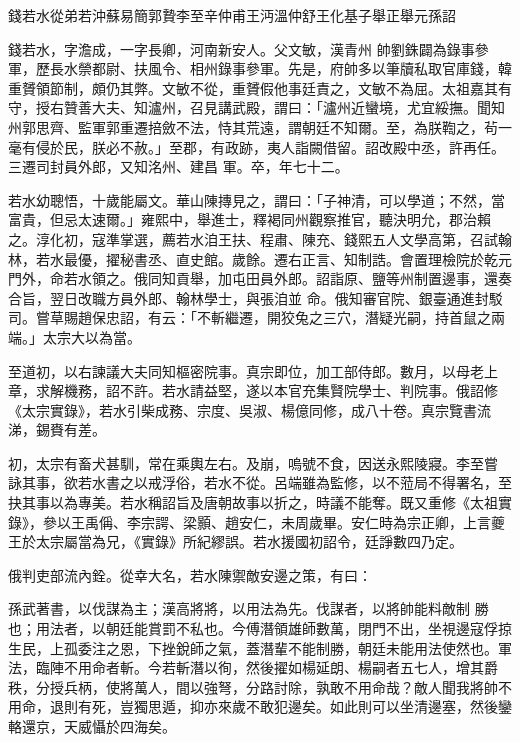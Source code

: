 
\begin{pinyinscope}

 錢若水從弟若沖蘇易簡郭贄李至辛仲甫王沔溫仲舒王化基子舉正舉元孫詔



 錢若水，字澹成，一字長卿，河南新安人。父文敏，漢青州
 帥劉銖闢為錄事參軍，歷長水禜都尉、扶風令、相州錄事參軍。先是，府帥多以筆牘私取官庫錢，韓重贇領節制，頗仍其弊。文敏不從，重贇假他事廷責之，文敏不為屈。太祖嘉其有守，授右贊善大夫、知瀘州，召見講武殿，謂曰：「瀘州近蠻境，尤宜綏撫。聞知州郭思齊、監軍郭重遷掊斂不法，恃其荒遠，謂朝廷不知爾。至，為朕鞫之，茍一毫有侵於民，朕必不赦。」至郡，有政跡，夷人詣闕借留。詔改殿中丞，許再任。三遷司封員外郎，又知洺州、建昌
 軍。卒，年七十二。



 若水幼聰悟，十歲能屬文。華山陳摶見之，謂曰：「子神清，可以學道；不然，當富貴，但忌太速爾。」雍熙中，舉進士，釋褐同州觀察推官，聽決明允，郡治賴之。淳化初，寇準掌選，薦若水洎王扶、程肅、陳充、錢熙五人文學高第，召試翰林，若水最優，擢秘書丞、直史館。歲餘。遷右正言、知制誥。會置理檢院於乾元門外，命若水領之。俄同知貢舉，加屯田員外郎。詔詣原、鹽等州制置邊事，還奏合旨，翌日改職方員外郎、翰林學士，與張洎並
 命。俄知審官院、銀臺通進封駁司。嘗草賜趙保忠詔，有云：「不斬繼遷，開狡兔之三穴，潛疑光嗣，持首鼠之兩端。」太宗大以為當。



 至道初，以右諫議大夫同知樞密院事。真宗即位，加工部侍郎。數月，以母老上章，求解機務，詔不許。若水請益堅，遂以本官充集賢院學士、判院事。俄詔修《太宗實錄》，若水引柴成務、宗度、吳淑、楊億同修，成八十卷。真宗覽書流涕，錫賚有差。



 初，太宗有畜犬甚馴，常在乘輿左右。及崩，嗚號不食，因送永熙陵寢。李至嘗
 詠其事，欲若水書之以戒浮俗，若水不從。呂端雖為監修，以不蒞局不得署名，至抉其事以為專美。若水稱詔旨及唐朝故事以折之，時議不能奪。既又重修《太祖實錄》，參以王禹偁、李宗諤、梁顥、趙安仁，未周歲畢。安仁時為宗正卿，上言夔王於太宗屬當為兄，《實錄》所紀繆誤。若水援國初詔令，廷諍數四乃定。



 俄判吏部流內銓。從幸大名，若水陳禦敵安邊之策，有曰：



 孫武著書，以伐謀為主；漢高將將，以用法為先。伐謀者，以將帥能料敵制
 勝也；用法者，以朝廷能賞罰不私也。今傅潛領雄師數萬，閉門不出，坐視邊寇俘掠生民，上孤委注之恩，下挫銳師之氣，蓋潛輩不能制勝，朝廷未能用法使然也。軍法，臨陣不用命者斬。今若斬潛以徇，然後擢如楊延朗、楊嗣者五七人，增其爵秩，分授兵柄，使將萬人，間以強弩，分路討除，孰敢不用命哉？敵人聞我將帥不用命，退則有死，豈獨思遁，抑亦來歲不敢犯邊矣。如此則可以坐清邊塞，然後鑾輅還京，天威懾於四海矣。




\end{pinyinscope}
